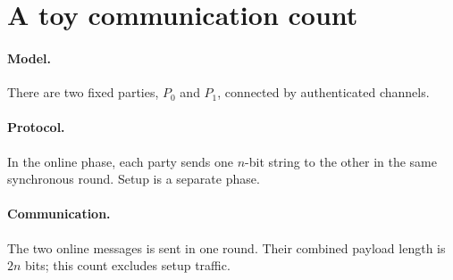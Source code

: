 \section{A toy communication count}\label{sec:toy-count}
\paragraph{Model.} There are two fixed parties, $P_0$ and $P_1$, connected by authenticated channels.
\paragraph{Protocol.} In the online phase, each party sends one $n$-bit string to the other in the same synchronous round. Setup is a separate phase.
\paragraph{Communication.} The two online messages is sent in one round. Their combined payload length is $2n$ bits; this count excludes setup traffic.
